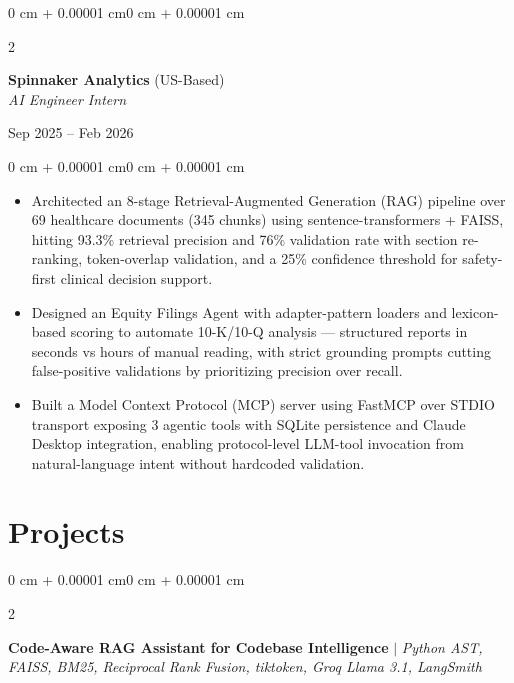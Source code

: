 \documentclass[9pt, letterpaper]{article}
\newenvironment{highlights}{
    \begin{itemize}[
        topsep=0.04 cm,
        parsep=0.04 cm,
        partopsep=0pt,
        itemsep=0pt,
        leftmargin=0 cm + 7pt
    ]
}{
    \end{itemize}
}
\newenvironment{onecolentry}{
    \begin{adjustwidth}{0 cm + 0.00001 cm}{0 cm + 0.00001 cm}
}{
    \end{adjustwidth}
}
\newenvironment{twocolentry}[2][]{
    \onecolentry
    \def\secondColumn{#2}
    \setcolumnwidth{\fill, 4.0 cm}
    \begin{paracol}{2}
}{
    \switchcolumn \raggedleft \secondColumn
    \end{paracol}
    \endonecolentry
}
\begin{document}
\vspace{0.2 cm}

\begin{twocolentry}{Sep 2025 -- Feb 2026}
    \textbf{Spinnaker Analytics} (US-Based) \\
    \textit{AI Engineer Intern}
\end{twocolentry}

\vspace{0.10 cm}

\begin{onecolentry}
    \begin{highlights}
        \item Architected an 8-stage Retrieval-Augmented Generation (RAG) pipeline over 69 healthcare documents (345 chunks) using sentence-transformers + FAISS, hitting 93.3\% retrieval precision and 76\% validation rate with section re-ranking, token-overlap validation, and a 25\% confidence threshold for safety-first clinical decision support.
        \item Designed an Equity Filings Agent with adapter-pattern loaders and lexicon-based scoring to automate 10-K/10-Q analysis --- structured reports in seconds vs hours of manual reading, with strict grounding prompts cutting false-positive validations by prioritizing precision over recall.
        \item Built a Model Context Protocol (MCP) server using FastMCP over STDIO transport exposing 3 agentic tools with SQLite persistence and Claude Desktop integration, enabling protocol-level LLM-tool invocation from natural-language intent without hardcoded validation.
    \end{highlights}
\end{onecolentry}

\section{Projects}

\begin{twocolentry}{}
    \textbf{Code-Aware RAG Assistant for Codebase Intelligence} $|$ \textit{Python AST, FAISS, BM25, Reciprocal Rank Fusion, tiktoken, Groq Llama 3.1, LangSmith}
\end{twocolentry}

\vspace{0.10 cm}
\end{document}
